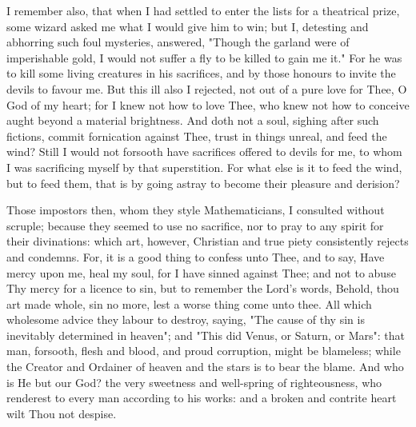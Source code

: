 \documentclass[b5paper,openright,12pt,twoside]{book}
\begin{document}
I remember also, that when I had settled to enter the lists for a
theatrical prize, some wizard asked me what I would give him to win; but
I, detesting and abhorring such foul mysteries, answered, "Though the
garland were of imperishable gold, I would not suffer a fly to be
killed to gain me it." For he was to kill some living creatures in his
sacrifices, and by those honours to invite the devils to favour me. But
this ill also I rejected, not out of a pure love for Thee, O God of my
heart; for I knew not how to love Thee, who knew not how to conceive
aught beyond a material brightness. And doth not a soul, sighing after
such fictions, commit fornication against Thee, trust in things unreal,
and feed the wind? Still I would not forsooth have sacrifices offered
to devils for me, to whom I was sacrificing myself by that superstition.
For what else is it to feed the wind, but to feed them, that is by going
astray to become their pleasure and derision?

Those impostors then, whom they style Mathematicians, I consulted
without scruple; because they seemed to use no sacrifice, nor to pray to
any spirit for their divinations: which art, however, Christian and
true piety consistently rejects and condemns. For, it is a good thing to
confess unto Thee, and to say, Have mercy upon me, heal my soul, for I
have sinned against Thee; and not to abuse Thy mercy for a licence to
sin, but to remember the Lord's words, Behold, thou art made whole, sin
no more, lest a worse thing come unto thee. All which wholesome advice
they labour to destroy, saying, "The cause of thy sin is inevitably
determined in heaven"; and "This did Venus, or Saturn, or Mars":
that man, forsooth, flesh and blood, and proud corruption, might be
blameless; while the Creator and Ordainer of heaven and the stars is
to bear the blame. And who is He but our God? the very sweetness and
well-spring of righteousness, who renderest to every man according to
his works: and a broken and contrite heart wilt Thou not despise.
\end{document}
